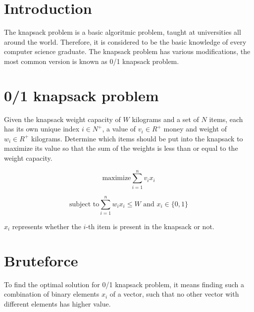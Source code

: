 \documentclass{article}
\begin{document}
\hrulefill
\section*{Introduction} %

The knapsack problem is a basic algoritmic problem, taught at universities all around the world. Therefore, it is considered to be the basic knowledge of every computer science graduate. The knapsack problem has various modifications, the most common version is known as 0/1 knapsack problem.


\section*{0/1 knapsack problem} %

 Given the knapsack weight capacity of $W$ kilograms and a set of $N$ items, each has its own unique index $i \in N^+$, a value of $v_i \in R^+$ money and weight of $w_i \in R^+$ kilograms. Determine which items should be put into the knapsack to maximize its value so that the sum of the weights is less than or equal to the weight capacity.

\begin{equation}
	\text{maximize}\sum_{i=1}^{n}{v_ix_i}
\end{equation}


\begin{equation}
	\text{subject to}\sum_{i=1}^{n}{w_ix_i} \leq W \text{ and }  x_i \in \{0,1\}
\end{equation}
\begin{info}
	$x_i$ represents whether the $i$-th item is present in the knapsack or not.
\end{info}
	\section{Bruteforce}
		To find the optimal solution for 0/1 knapsack problem, it means finding such a combination of binary elements $x_i$ of a vector, such that no other vector with different elements has higher value. 
\end{document}

